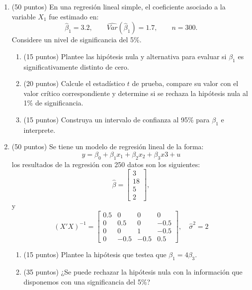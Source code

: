 \documentclass[10pt,a4paper]{article}
\begin{document}
 
\begin{enumerate}

    \item (50 puntos) En una regresión lineal simple, el coeficiente asociado a la variable
        \(X_1\) fue estimado en:
        \[
          \hat\beta_1 = 3.2,
          \qquad \hat{Var}(\hat\beta_1) = 1.7,
          \qquad n = 300.
        \]
        Considere un nivel de significancia del 5\%.

        \begin{enumerate}[label=\alph*)]
          \item (15 puntos) Plantee las hipótesis nula y alternativa para evaluar si
                \( \beta_1 \) es significativamente distinto de cero.
          \item (20 puntos) Calcule el estadístico \( t \) de prueba, compare su valor
                con el valor crítico correspondiente y determine si se
                rechaza la hipótesis nula al 1\% de significancia.
          \item (15 puntos) Construya un intervalo de confianza al 95\% para
                \( \beta_1 \) e interprete.
        \end{enumerate}


\item (50 puntos) Se tiene un modelo de regresión lineal de la forma:
$$y=\beta_0 + \beta_1 x_1+\beta_2x_2+\beta_3 x3 + u$$
los resultados de la regresión con 250 datos son los siguientes:
        \[
          \hat{\beta} = \begin{bmatrix} 3 \\ 18 \\ 5 \\2 \end{bmatrix},
        \]
y 
        \[
          (X'X)^{-1} =
          \begin{bmatrix}
0.5 & 0  & 0  &  0\\
0 & 0.5  & 0  & -0.5\\
0 & 0  & 1  & -0.5\\
0 & -0.5 & -0.5 &  0.5
\end{bmatrix},
          \quad \hat{\sigma}^2 = 2
        \]
\begin{enumerate}
    \item (15 puntos) Plantee la hipótesis que testea que $\beta_1=4\beta_3$.

    \item (35 puntos) ¿Se puede rechazar la hipótesis nula con la información que disponemos con una significancia del 5\%? 
\end{enumerate}




\end{enumerate}
\end{document}
